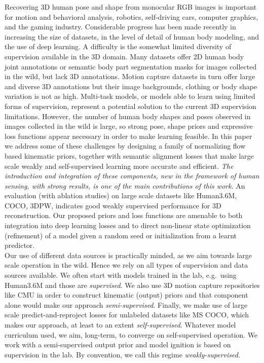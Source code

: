 \documentclass[runningheads]{llncs}
\newcommand{\eg}{e.g.\ }
\begin{document}
Recovering 3D human pose and shape from monocular RGB images is important for motion and behavioral analysis, robotics, self-driving cars, computer graphics, and the gaming industry. Considerable progress has been made recently in increasing the size of datasets, in the level of detail of human body modeling, and the use of deep learning. A difficulty is the somewhat limited diversity of supervision available in the 3D domain. Many datasets offer 2D human body joint annotations or semantic body part segmentation masks for images collected in the wild, but lack 3D annotations. Motion capture datasets in turn offer large and diverse 3D annotations but their image backgrounds, clothing or body shape variation is not as high. Multi-task models, or models able to learn using limited forms of supervision, represent a potential solution to the current 3D supervision limitations. However, the number of human body shapes and poses observed in images collected in the wild is large, so strong pose, shape priors and expressive loss functions appear necessary in order to make learning feasible. In this paper we address some of these challenges by designing a family of normalizing flow based kinematic priors, together with semantic alignment losses that make large scale weakly and self-supervised learning more accurate and efficient. \emph{The introduction and integration of these components, new in the framework of human sensing, with strong results, is one of the main contributions of this work}. An evaluation (with ablation studies) on large scale datasets like Human3.6M, COCO, 3DPW, indicates good weakly supervised performance for 3D reconstruction. Our proposed priors and loss functions are amenable to both integration into deep learning losses and to direct non-linear state optimization (refinement) of a model given a random seed or initialization from a learnt predictor. \\
 Our use of different data sources is practically minded, as we aim towards large scale operation in the wild. Hence we rely on all types of supervision and data sources available.
We often start with models trained in the lab, \eg using Human3.6M and those are \emph{supervised}. We also use 3D motion capture repositories like CMU in order to construct kinematic (output) priors and that component alone would make our approach \emph{semi-supervised}. Finally, we make use of large scale predict-and-reproject losses for unlabeled datasets like MS COCO, which makes our approach, at least to an extent \emph{self-supervised}. Whatever model curriculum used, we aim, long-term, to converge on self-supervised operation. We work with a semi-supervised output prior and model ignition is based on supervision in the lab. By convention, we call this regime \emph{weakly-supervised}.
\end{document}
